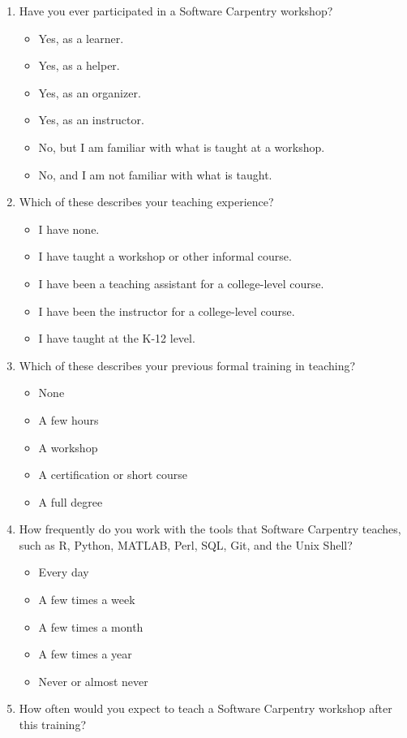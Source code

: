 \documentclass[10pt,statementpaper]{memoir}
\providecommand{\tightlist}{%
  \setlength{\itemsep}{0pt}\setlength{\parskip}{0pt}}
\begin{document}
\begin{enumerate}
\def\labelenumi{\arabic{enumi}.}
\tightlist
\item
  Have you ever participated in a Software Carpentry workshop?

  \begin{itemize}
  \tightlist
  \item
    Yes, as a learner.
  \item
    Yes, as a helper.
  \item
    Yes, as an organizer.
  \item
    Yes, as an instructor.
  \item
    No, but I am familiar with what is taught at a workshop.
  \item
    No, and I am not familiar with what is taught.
  \end{itemize}
\item
  Which of these describes your teaching experience?

  \begin{itemize}
  \tightlist
  \item
    I have none.
  \item
    I have taught a workshop or other informal course.
  \item
    I have been a teaching assistant for a college-level course.
  \item
    I have been the instructor for a college-level course.
  \item
    I have taught at the K-12 level.
  \end{itemize}
\item
  Which of these describes your previous formal training in teaching?

  \begin{itemize}
  \tightlist
  \item
    None
  \item
    A few hours
  \item
    A workshop
  \item
    A certification or short course
  \item
    A full degree
  \end{itemize}
\item
  How frequently do you work with the tools that Software Carpentry
  teaches, such as R, Python, MATLAB, Perl, SQL, Git, and the Unix
  Shell?

  \begin{itemize}
  \tightlist
  \item
    Every day
  \item
    A few times a week
  \item
    A few times a month
  \item
    A few times a year
  \item
    Never or almost never
  \end{itemize}
\item
  How often would you expect to teach a Software Carpentry workshop
  after this training?


\end{enumerate}
\end{document}
